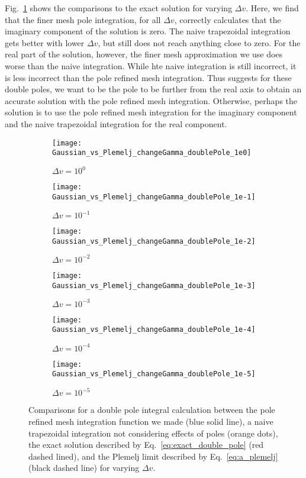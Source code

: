 Fig.~\ref{f:double_pole_comparison} shows the comparisons to the exact solution for varying $\Delta v$.
Here, we find that the finer mesh pole integration, for all $\Delta v$, correctly calculates that the 
imaginary component of the solution is zero.
The naive trapezoidal integration gets better with lower $\Delta v$, but still does not reach anything close to zero.
For the real part of the solution, however, the finer mesh approximation we use does worse 
than the naive integration. While hte naive integration is still incorrect, it is less incorrect than the pole refined mesh integration.
Thus suggests for these double poles, we want to be the pole to be further from the real axis to obtain an accurate solution
with the pole refined mesh integration. 
Otherwise, perhaps the solution is to use the pole refined mesh integration for the imaginary component and the naive trapezoidal integration for the real component.

\begin{figure}[!htb]
	\centering
	\begin{subfigure}{.32\textwidth}
		\texttt{[image: Gaussian\_vs\_Plemelj\_changeGamma\_doublePole\_1e0]}
		\caption{$\Delta v = 10^0$}
	\end{subfigure}
	\begin{subfigure}{.32\textwidth}
		\texttt{[image: Gaussian\_vs\_Plemelj\_changeGamma\_doublePole\_1e-1]}
		\caption{$\Delta v = 10^{-1}$}
	\end{subfigure}
	\begin{subfigure}{.32\textwidth}
		\texttt{[image: Gaussian\_vs\_Plemelj\_changeGamma\_doublePole\_1e-2]}
		\caption{$\Delta v = 10^{-2}$}
	\end{subfigure}
	\begin{subfigure}{.32\textwidth}
		\texttt{[image: Gaussian\_vs\_Plemelj\_changeGamma\_doublePole\_1e-3]}
		\caption{$\Delta v = 10^{-3}$}
	\end{subfigure}
	\begin{subfigure}{.32\textwidth}
		\texttt{[image: Gaussian\_vs\_Plemelj\_changeGamma\_doublePole\_1e-4]}
		\caption{$\Delta v = 10^{-4}$}
	\end{subfigure}
	\begin{subfigure}{.32\textwidth}
		\texttt{[image: Gaussian\_vs\_Plemelj\_changeGamma\_doublePole\_1e-5]}
		\caption{$\Delta v = 10^{-5}$}
	\end{subfigure}
	\caption{Comparisons for a double pole integral calculation
		between the pole refined mesh integration function we made (blue solid line), %
		a naive trapezoidal integration not considering effects of poles (orange dots), 
		the exact solution described by Eq.~\ref{eq:exact_double_pole} (red dashed lined), 
		and the Plemelj limit described by Eq.~\ref{eq:a_plemelj} (black dashed line)
		for varying $\Delta v$.}
	\label{f:double_pole_comparison}
\end{figure}

